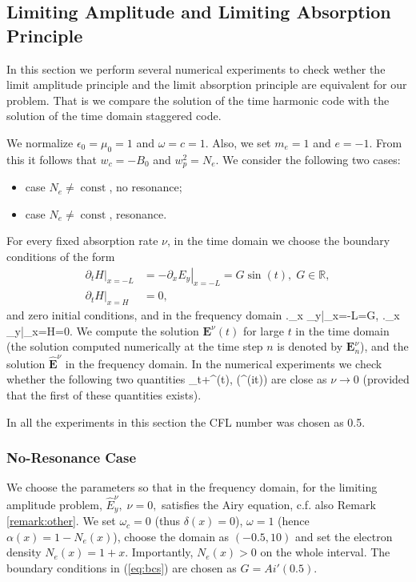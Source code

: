 \subsection{Limiting Amplitude and Limiting Absorption Principle}
In this section we perform several numerical experiments to check wether the limit amplitude
principle and the limit
absorption principle are equivalent for our problem.
That is we compare the solution of the time harmonic code with the solution of the time domain staggered code.

We normalize  $\epsilon_0=\mu_0=1$ and $\omega=c=1$. 
Also, we set $m_e=1$ and $e=-1$. From this it follows that $w_c=-B_0$ and $w_p^2=N_e$. 
We consider the following two cases:
\begin{itemize}
 \item case $N_e\neq \operatorname{const}$, no resonance;
 \item case $N_e\neq \operatorname{const}$, resonance.
\end{itemize}
For every fixed absorption rate $\nu$, in the time domain we choose the boundary conditions of the form
\begin{align}
\label{eq:bcs}
\left.\partial_t H\right|_{x=-L}&=-\left.\partial_x E_y\right|_{x=-L}=G\sin(t),\; G\in \mathbb{R}, \\
 \nonumber
 \left.\partial_t H\right|_{x=H}&=0,
\end{align}
and zero initial conditions, and in the frequency domain
\bealn
 \left.\partial_x _y\right|_{x=-L}=G,\; \left.\partial_x _y\right|_{x=H}=0.
\eealn
We compute the solution $\mathbf{E}^{\nu}(t)$ for large $t$ in the time domain 
(the solution computed numerically at the time step $n$ is denoted by $\mathbf{E}^{\nu}_{n}$), and the solution $\hat{\mathbf{E}}^{\nu}$ in the frequency domain. 
In the numerical experiments we check whether the following two quantities
\ben
\lim_{t\rightarrow+\infty}^{\nu}(t),  \Im\left(^{\nu}\exp(it)\right)
\een
are close as $\nu\rightarrow 0$ (provided that the first of these quantities exists). 

In all the experiments in this section the CFL number was chosen as 0.5.
\subsubsection{No-Resonance Case}
We choose the parameters so that in the frequency domain, for the limiting amplitude problem, $\hat{E}_{y}^{\nu},\; \nu=0,$ satisfies 
the Airy equation, c.f. also Remark \ref{remark:other}. We set $\omega_c=0$ (thus $\delta(x)=0$), $\omega=1$ (hence $\alpha(x)=1-N_e(x)$), 
choose the domain as $(-0.5, 10)$ and set the electron density $N_e(x)=1+x$. Importantly, $N_e(x)>0$ on the whole interval.
The boundary conditions in (\ref{eq:bcs}) are chosen as $G=Ai'(0.5)$. 

